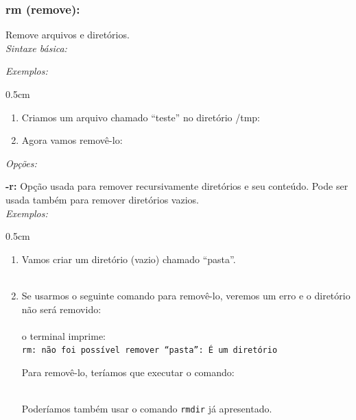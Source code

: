 \begin{refsection}
\subsubsection{rm (remove):}\label{tut1:text_mode:commands:rm}
Remove arquivos e diretórios.\\
 \textit{Sintaxe básica:}
\\

\textit{Exemplos:}
\begin {myindentpar}{0.5cm}
\begin{enumerate}[\itshape i.]

\item{Criamos um arquivo chamado ``teste'' no diretório /tmp:}\\

\item{Agora vamos removê-lo:}\\

\end{enumerate}
\end{myindentpar}

\textit{Opções:}

\textbf{-r:} Opção usada para remover recursivamente diretórios e seu conteúdo. Pode ser usada também para remover diretórios vazios.\\

\textit{Exemplos:}
\begin {myindentpar}{0.5cm}
\begin{enumerate}[\itshape i.]

 \item{Vamos criar um diretório (vazio) chamado ``pasta''.}\\
	\\
 \item{Se usarmos o seguinte comando para removê-lo, veremos um erro e o diretório não será removido:}\\
	\\
o terminal imprime:\\
\texttt{rm: não foi possível remover “pasta”: É um diretório}

Para removê-lo, teríamos que executar o comando:

 \\
Poderíamos também usar o comando \texttt{rmdir} já apresentado.\\


\end{enumerate}
\end{myindentpar}
\end{refsection}
